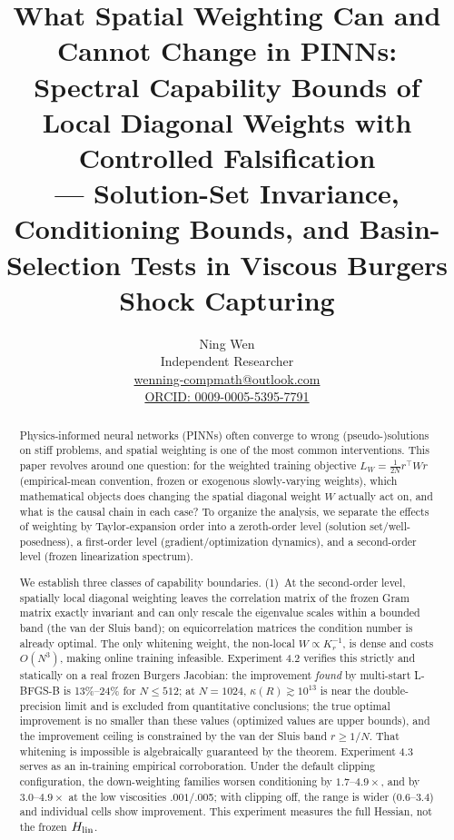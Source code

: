 \documentclass[11pt]{article}
\title{\textbf{What Spatial Weighting Can and Cannot Change in PINNs:\\Spectral Capability Bounds of Local Diagonal Weights with Controlled Falsification}\\[3pt]
\large --- Solution-Set Invariance, Conditioning Bounds, and Basin-Selection Tests in Viscous Burgers Shock Capturing}
\author{Ning Wen\\[2pt]
\small Independent Researcher\\[1pt]
\small \href{mailto:wenning-compmath@outlook.com}{wenning-compmath@outlook.com}\\[1pt]
\small \href{https://orcid.org/0009-0005-5395-7791}{ORCID: 0009-0005-5395-7791}}
\date{}
\newcommand{\W}{W}
\numberwithin{equation}{section}
\begin{document}
\maketitle
\begin{abstract}

Physics-informed neural networks (PINNs) often converge to wrong (pseudo-)solutions on stiff problems, and spatial weighting is one of the most common interventions. This paper revolves around one question: for the weighted training objective $L_\W=\tfrac{1}{2N} r^\top \W r$ (empirical-mean convention, frozen or exogenous slowly-varying weights), which mathematical objects does changing the spatial diagonal weight $\W$ actually act on, and what is the causal chain in each case? To organize the analysis, we separate the effects of weighting by Taylor-expansion order into a zeroth-order level (solution set/well-posedness), a first-order level (gradient/optimization dynamics), and a second-order level (frozen linearization spectrum).

We establish three classes of capability boundaries. (1)~At the second-order level, spatially local diagonal weighting leaves the correlation matrix of the frozen Gram matrix exactly invariant and can only rescale the eigenvalue scales within a bounded band (the van der Sluis band); on equicorrelation matrices the condition number is already optimal. The only whitening weight, the non-local $\W\propto K_r^{-1}$, is dense and costs $O(N^3)$, making online training infeasible. Experiment 4.2 verifies this strictly and statically on a real frozen Burgers Jacobian: the improvement \emph{found} by multi-start L-BFGS-B is 13\%--24\% for $N\le512$; at $N=1024$, $\kappa(R)\gtrsim10^{13}$ is near the double-precision limit and is excluded from quantitative conclusions; the true optimal improvement is no smaller than these values (optimized values are upper bounds), and the improvement ceiling is constrained by the van der Sluis band $r\ge1/N$. That whitening is impossible is algebraically guaranteed by the theorem. Experiment 4.3 serves as an in-training empirical corroboration. Under the default clipping configuration, the down-weighting families worsen conditioning by $1.7$--$4.9\times$, and by $3.0$--$4.9\times$ at the low viscosities $.001$/.005; with clipping off, the range is wider ($0.6$--$3.4$) and individual cells show improvement. This experiment measures the full Hessian, not the frozen $H_{\rm lin}$.


\end{abstract}
\end{document}
